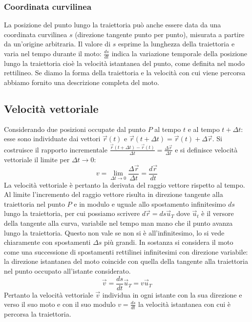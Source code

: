 \documentclass[class=book, crop=false, oneside, 12pt]{standalone}
\begin{document}
    \subsubsection{Coordinata curvilinea}
    La posizione del punto lungo la traiettoria può anche essere data da una coordinata curvilinea \(s\) (direzione tangente punto per punto), misurata a partire da un'origine arbitraria.
    Il valore di \(s\) esprime la lunghezza della traiettoria e varia nel tempo durante il moto: \(\frac{ds}{dt}\) indica la variazione temporale della posizione lungo la traiettoria cioè la velocità istantanea del punto, come definita nel modo rettilineo.
    Se diamo la forma della traiettoria e la velocità con cui viene percorsa abbiamo fornito una descrizione completa del moto.
  \subsection{Velocit\`a vettoriale}
  Considerando due posizioni occupate dal punto \(P\) al tempo \(t\) e al tempo \(t + \Delta t\): esse sono individuate dai vettori \(\overrightarrow{r}(t)\) e \(\overrightarrow{r}(t + \Delta t) = \overrightarrow{r}(t) + \Delta \overrightarrow{r}\).
  Si costruisce il rapporto incrementale \(\frac{\overrightarrow{r}(t+\Delta t) - \overrightarrow{r}(t)}{\Delta t} = \frac{\Delta \overrightarrow{r}}{\Delta t}\) e si definisce velocità vettoriale il limite per \(\Delta t \rightarrow 0\):
  \begin{equation*}
    v = \lim\limits_{\Delta t \rightarrow 0} \dfrac{\Delta\overrightarrow{r}}{\Delta t}= \dfrac{d \overrightarrow{r}}{dt}
  \end{equation*}
  La velocità vettoriale è pertanto la derivata del raggio vettore rispetto al tempo.
  Al limite l'incremento del raggio vettore risulta in direzione tangente alla traiettoria nel punto \(P\) e in modulo e uguale allo spostamento infinitesimo \(ds\) lungo la traiettoria,
  per cui possiamo scrivere \(d \overrightarrow{r} = ds \overrightarrow{u}_T\) dove \(\overrightarrow{u}_t\) è il versore della tangente alla curva, variabile nel tempo man mano che il punto avanza lungo la traiettoria.
  Questo non vale se non si è all'infinitesimo, lo si vede chiaramente con spostamenti \(\Delta s\) più grandi.
  In sostanza si considera il moto come una successione di spostamenti rettilinei infinitesimi con direzione variabile: la direzione istantanea del moto coincide con quella della tangente alla traiettoria nel punto occupato all'istante considerato.
  \begin{equation*}
    \overrightarrow{v} = \frac{ds}{dt} \overrightarrow{u}_T = v \overrightarrow{u}_T
  \end{equation*}
  Pertanto la velocità vettoriale \(\overrightarrow{v}\) individua in ogni istante con la sua direzione e verso il suo moto e con il suo modulo \(v = \frac{ds}{dt}\) la velocità istantanea con cui è percorsa la traiettoria.
\end{document}
